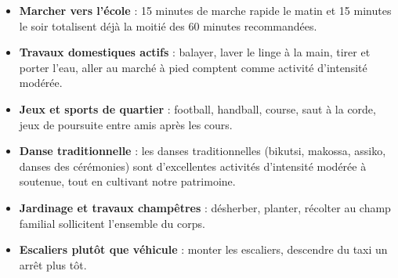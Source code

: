 \documentclass[11pt]{article}
\begin{document}
\begin{itemize}
\item \textbf{Marcher vers l'école} : 15 minutes de marche rapide le matin et 15 minutes le soir totalisent déjà la moitié des 60 minutes recommandées.
\item \textbf{Travaux domestiques actifs} : balayer, laver le linge à la main, tirer et porter l'eau, aller au marché à pied comptent comme activité d'intensité modérée.
\item \textbf{Jeux et sports de quartier} : football, handball, course, saut à la corde, jeux de poursuite entre amis après les cours.
\item \textbf{Danse traditionnelle} : les danses traditionnelles (bikutsi, makossa, assiko, danses des cérémonies) sont d'excellentes activités d'intensité modérée à soutenue, tout en cultivant notre patrimoine.
\item \textbf{Jardinage et travaux champêtres} : désherber, planter, récolter au champ familial sollicitent l'ensemble du corps.
\item \textbf{Escaliers plutôt que véhicule} : monter les escaliers, descendre du taxi un arrêt plus tôt.
\end{itemize}
\end{document}
